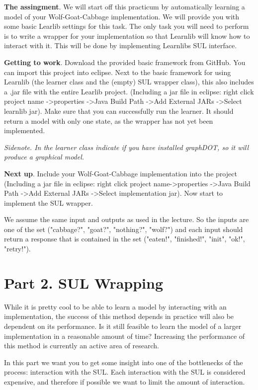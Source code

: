 \documentclass[a4paper]{article}
\begin{document}
\textbf{The assingment}. We will start off this practicum by automatically learning a model of your Wolf-Goat-Cabbage implementation. We will provide you with some basic Learlib settings for this task. The only task you will need to perform is to write a wrapper for your implementation so that Learnlib will know how to interact with it.  This will be done by implementing Learnlibs SUL interface.

\textbf{Getting to work}. Download the provided basic framework from GitHub. You can import this project into eclipse. Next to the basic framework for using Learnlib (the learner class and the (empty) SUL wrapper class), this also includes a .jar file with the entire Learlib project. (Including a jar file in eclipse: right click project name  -\textgreater properties  -\textgreater Java Build Path -\textgreater Add External JARs -\textgreater Select learnlib jar). Make sure that you can successfully run the learner. It should return a model with only one state, as the wrapper has not yet been implemented.

\emph{Sidenote. In the learner class indicate if you have installed graphDOT, so it will produce a graphical model.}

\textbf{Next up}. Include your Wolf-Goat-Cabbage implementation into the project (Including a jar file in eclipse: right click project name-\textgreater properties  -\textgreater Java Build Path  -\textgreater  Add External JARs  -\textgreater  Select implementation jar). Now start to implement the SUL wrapper. 

We assume the same input and outputs as used in the lecture. So the inputs are one of the set ("cabbage?", "goat?", "nothing?", "wolf?") and each input should return a response that is contained in the set ("eaten!", "finished!", "init", "ok!", "retry!").

\section*{Part 2. SUL Wrapping}


While it is pretty cool to be able to learn a model by interacting with an implementation, the success of this method depends in practice will also be dependent on its performance. Is it still feasible to learn the model of a larger implementation in a reasonable amount of time? Increasing the performance of this method is currently an active area of research.

In this part we want you to get some insight into one of the bottlenecks of the process: interaction with the SUL. Each interaction with the SUL is considered expensive, and therefore if possible we want to limit the amount of interaction.
 
\end{document}
